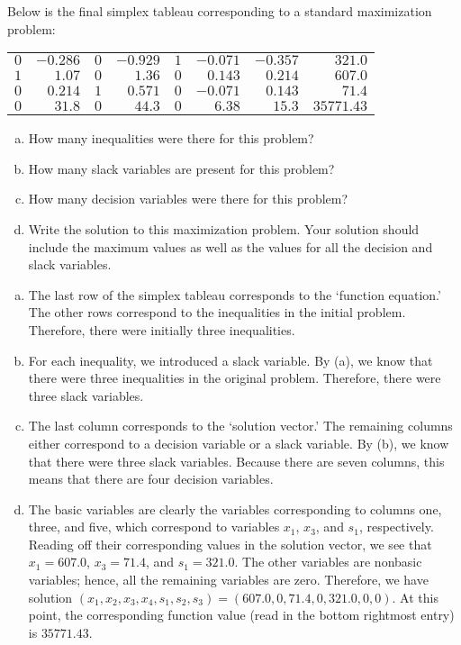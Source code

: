 \documentclass[11pt,letterpaper]{article}
\begin{document}
 Below is the final simplex tableau corresponding to a standard maximization problem:
	\begin{table}[!ht]
	\centering
	\begin{tabular}{rrrrrrr|r}
	$0$ & $-0.286$ & $0$ & $-0.929$ & $1$ & $-0.071$ & $-0.357$ & $321.0$ \\
	$1$ & $1.07$ & $0$ & $1.36$ & $0$ & $0.143$ & $0.214$ & $607.0$ \\
	$0$ & $0.214$ & $1$ & $0.571$ & $0$ & $-0.071$ & $0.143$ & $71.4$ \\ \hline
	$0$ & $31.8$ & $0$ & $44.3$ & $0$ & $6.38$ & $15.3$ & $35771.43$
	\end{tabular}
	\end{table} 
\begin{enumerate}[(a)]
\item How many inequalities were there for this problem?
\item How many slack variables are present for this problem?
\item How many decision variables were there for this problem?
\item Write the solution to this maximization problem. Your solution should include the maximum values as well as the values for all the decision and slack variables.
\end{enumerate} \pspace

\sol
\begin{enumerate}[(a)]
\item The last row of the simplex tableau corresponds to the `function equation.' The other rows correspond to the inequalities in the initial problem. Therefore, there were initially three inequalities. 
 
\item For each inequality, we introduced a slack variable. By (a), we know that there were three inequalities in the original problem. Therefore, there were three slack variables. 

\item The last column corresponds to the `solution vector.' The remaining columns either correspond to a decision variable or a slack variable. By (b), we know that there were three slack variables. Because there are seven columns, this means that there are four decision variables. 

\item The basic variables are clearly the variables corresponding to columns one, three, and five, which correspond to variables $x_1$, $x_3$, and $s_1$, respectively. Reading off their corresponding values in the solution vector, we see that $x_1= 607.0$, $x_3= 71.4$, and $s_1= 321.0$. The other variables are nonbasic variables; hence, all the remaining variables are zero. Therefore, we have solution $(x_1, x_2, x_3, x_4, s_1, s_2, s_3)= (607.0, 0, 71.4, 0, 321.0, 0, 0)$. At this point, the corresponding function value (read in the bottom rightmost entry) is $35771.43$.
\end{enumerate}
\end{document}
